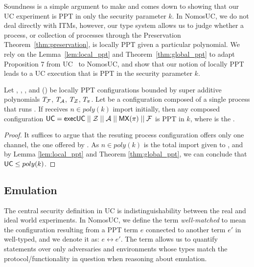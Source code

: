 Soundness is a simple argument to make and comes down to showing that our UC experiment is PPT in only the security parameter $k$. 
In NomosUC, we do not deal directly with ITMs, however, our type system allows us to judge whether a process, or collection of processes through the Preservation Theorem~\ref{thm:preservation}, is locally PPT given a particular polynomial. 
We rely on the Lemma~\ref{lem:local_ppt} and Theorem~\ref{thm:global_ppt} to adapt Proposition 7 from UC~\cite{canettiUC} to NomosUC, and show that our notion of locally PPT leads to a UC execution that is PPT in the security parameter $k$.

\begin{theorem} \label{thm:soundness}
Let \F, \A, \Z, and (\PI) be locally PPT configurations bounded by super additive polynomials $T_\mathcal{F}$, $T_\mathcal{A}$, $T_\mathcal{Z}$, $T_\pi$. Let  be a configuration composed of a single process that runs . If  receives $n \in poly(k)$ import initially, then any composed configuration $\mathsf{UC} = \mathsf{execUC} \; || \; \mathcal{Z} \; || \; \mathcal{A} \; || \; \mathsf{MX}(\pi) \; || \; \mathcal{F}$ is PPT in $k$, where  is the \partywrapper.
\end{theorem}

\begin{proof}
It suffices to argue that the resuting process configuration  offers only one channel, the one offered by .
As $n \in poly(k)$ is the total import given to , and by Lemma \ref{lem:local_ppt} and Theorem \ref{thm:global_ppt}, we can conclude that $\mathsf{UC} \leq poly(k)$.
\end{proof}

\subsection{Emulation}
The central security definition in UC is indistinguishability between the real and ideal world experiments.
In NomosUC, we define the term \textit{well-matched} to mean the configuration resulting from a PPT term $e$ connected to another term $e'$ in well-typed, and we denote it as: $e \leftrightarrow e'$.
The term allows us to quantify statements over only adversaries and environments whose types match the protocol/functionality in question when reasoning about emulation. 

